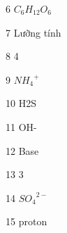 \begin{loigiaibt}{6}
 $C_6H_{12}O_6$
\end{loigiaibt}
\begin{loigiaibt}{7}
 Lưỡng tính
\end{loigiaibt}
\begin{loigiaibt}{8}
 4
\end{loigiaibt}
\begin{loigiaibt}{9}
 ${NH_4}^+$
\end{loigiaibt}
\begin{loigiaibt}{10}
 H2S
\end{loigiaibt}
\begin{loigiaibt}{11}
 OH-
\end{loigiaibt}
\begin{loigiaibt}{12}
 Base
\end{loigiaibt}
\begin{loigiaibt}{13}
 3
\end{loigiaibt}
\begin{loigiaibt}{14}
 ${SO_4}^{2-}$
\end{loigiaibt}
\begin{loigiaibt}{15}
 proton
\end{loigiaibt}
